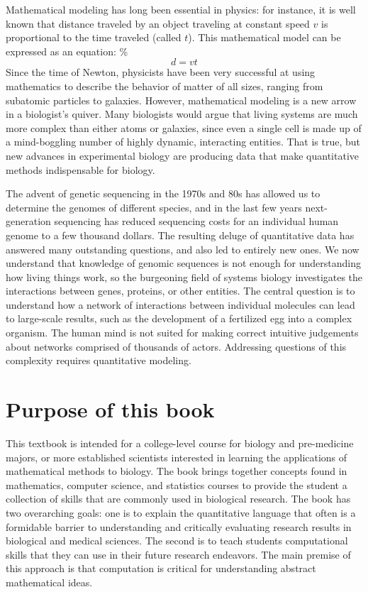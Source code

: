 \documentclass[
]{book}
\theoremstyle{definition}
\theoremstyle{definition}
\theoremstyle{definition}
\theoremstyle{remark}
\begin{document}
Mathematical modeling has long been essential in physics: for instance, it is well known that distance traveled by an object traveling at constant speed \(v\) is proportional to the time traveled (called \(t\)). This mathematical model can be expressed as an equation:
\%\[d = vt\]
Since the time of Newton, physicists have been very successful at using mathematics to describe the behavior of matter of all sizes, ranging from subatomic particles to galaxies. However, mathematical modeling is a new arrow in a biologist's quiver. Many biologists would argue that living systems are much more complex than either atoms or galaxies, since even a single cell is made up of a mind-boggling number of highly dynamic, interacting entities. That is true, but new advances in experimental biology are producing data that make quantitative methods indispensable for biology.

The advent of  genetic sequencing in the 1970s and 80s has allowed us to determine the genomes of different species, and in the last few years  next-generation sequencing has reduced sequencing costs for an individual human genome to a few thousand dollars. The resulting deluge of quantitative data has answered many outstanding questions, and also led to entirely new ones. We now understand that knowledge of genomic sequences is not enough for understanding how living things work, so the burgeoning field of  systems biology investigates the interactions between genes, proteins, or other entities. The central question is to understand how a network of interactions between individual molecules can lead to large-scale results, such as the development of a fertilized egg into a complex organism. The human mind is not suited for making correct intuitive judgements about networks comprised of thousands of actors. Addressing questions of this complexity requires quantitative modeling.

\hypertarget{purpose-of-this-book}{%
\section{Purpose of this book}\label{purpose-of-this-book}}

This textbook is intended for a college-level course for biology and pre-medicine majors, or more established scientists interested in learning the applications of mathematical methods to biology. The book brings together concepts found in mathematics, computer science, and statistics courses to provide the student a collection of skills that are commonly used in biological research. The book has two overarching goals: one is to explain the quantitative language that often is a formidable barrier to understanding and critically evaluating research results in biological and medical sciences. The second is to teach students computational skills that they can use in their future research endeavors. The main premise of this approach is that computation is critical for understanding abstract mathematical ideas.
\end{document}
